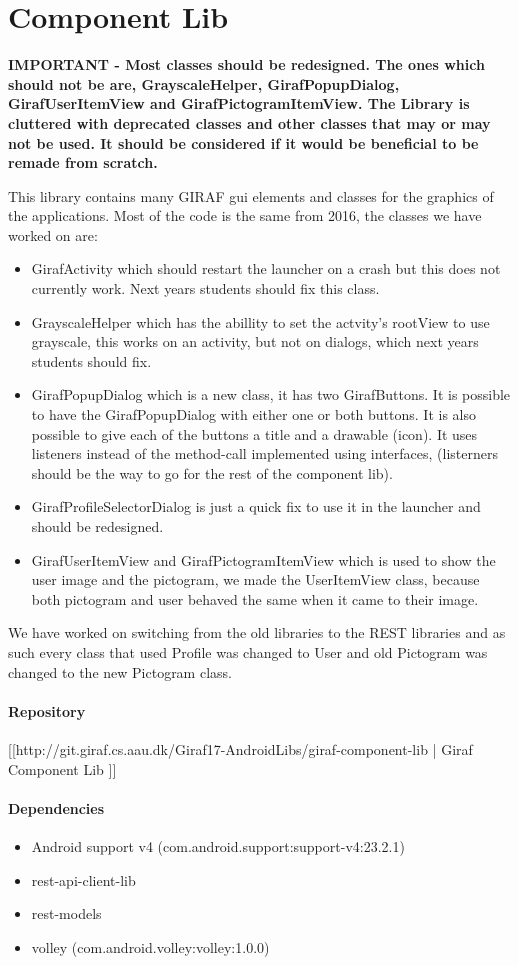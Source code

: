 \chapter{Component Lib}
\textbf{IMPORTANT - Most classes should be redesigned. The ones which should not
be are, GrayscaleHelper, GirafPopupDialog, GirafUserItemView and
GirafPictogramItemView. The Library is cluttered with deprecated classes and
other classes that may or may not be used. It should be considered if it would
be beneficial to be remade from scratch.}

This library contains many GIRAF gui elements and classes for the graphics of
the applications. Most of the code is the same from 2016, the classes we have
worked on are:

\begin{itemize}
  \item GirafActivity which should restart the launcher on a crash but this
  does not currently work. Next years students should fix this class.
  \item GrayscaleHelper which has the abillity to set the actvity's rootView to
  use grayscale, this works on an activity, but not on dialogs,  which next
  years students should fix.
  \item GirafPopupDialog which is a new class, it has two GirafButtons. It is
  possible to have the GirafPopupDialog with either one or both buttons. It is
  also possible to give each of the buttons a title and a drawable (icon). It
  uses listeners instead of the method-call implemented using interfaces,
  (listerners should be the way to go for the rest of the component lib).
  \item GirafProfileSelectorDialog is just a quick fix to use it in the launcher
  and should be redesigned.
  \item GirafUserItemView and GirafPictogramItemView which is used to show the
  user image and the pictogram,  we made the UserItemView class, because both
  pictogram and user behaved the same when it came to their image.
  
\end{itemize}

We have worked on switching from the old libraries to the REST libraries and as
such every class that used Profile was changed to User and old Pictogram was
changed to the new Pictogram class.

\subsubsection{Repository}
[[http://git.giraf.cs.aau.dk/Giraf17-AndroidLibs/giraf-component-lib | Giraf Component Lib ]]

\subsubsection{Dependencies}
\begin{itemize}
  \item Android support v4 (com.android.support:support-v4:23.2.1)
  \item rest-api-client-lib
  \item rest-models
  \item volley (com.android.volley:volley:1.0.0)
\end{itemize}

